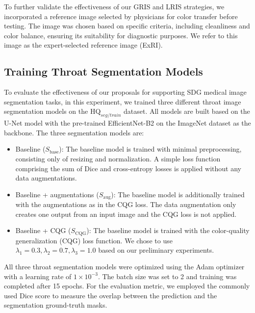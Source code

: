 To further validate the effectiveness of our GRIS and LRIS strategies, we incorporated a reference image selected by physicians for color transfer before testing. 
The image was chosen based on specific criteria, including cleanliness and color balance, ensuring its suitability for diagnostic purposes. 
We refer to this image as the expert-selected reference image (ExRI). 


\subsection{Training Throat Segmentation Models}
To evaluate the effectiveness of our proposals for supporting SDG medical image segmentation tasks, in this experiment, we trained three different throat image segmentation models on the $\mathrm{HQ}_{seg/train}$ dataset. 
All models are built based on the U-Net \cite{ronneberger15unet} model with the pre-trained EfficientNet-B2 \cite{tan2019efficientnet} on the ImageNet dataset as the backbone. 
The three segmentation models are:
\begin{itemize}
    \item Baseline ($S_{\mathrm{base}}$): The baseline model is trained with minimal preprocessing, consisting only of resizing and normalization. 
    A simple loss function comprising the sum of Dice and cross-entropy losses is applied without any data augmentations. 
    
    \item Baseline + augmentations ($S_{\mathrm{aug}}$): The baseline model is additionally trained with the augmentations as in the CQG loss. 
    The data augmentation only creates one output from an input image and the CQG loss is not applied. 
    
    \item Baseline + CQG ($S_{\mathrm{CQG}}$): The baseline model is trained with the color-quality generalization (CQG) loss function. 
    We chose to use $\lambda_{1}=0.3, \lambda_{2}=0.7, \lambda_{3}=1.0$ based on our preliminary experiments. 
\end{itemize}

All three throat segmentation models were optimized using the Adam optimizer \cite{kingma2015adam} with a learning rate of $1 \times 10^{-3}$. 
The batch size was set to 2 and training was completed after 15 epochs. 
For the evaluation metric, we employed the commonly used Dice score to measure the overlap between the prediction and the segmentation ground-truth masks. 

